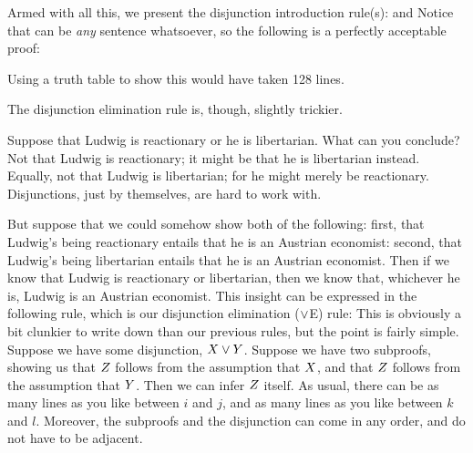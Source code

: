 Armed with all this, we present the disjunction introduction rule(s):
and
Notice that \metaY can be \emph{any} sentence whatsoever, so the following is a perfectly acceptable proof:
\begin{pf}
\end{pf}
Using a truth table to show this would have taken 128 lines.

The disjunction elimination rule is, though, slightly trickier. 

Suppose that  Ludwig is reactionary or he is libertarian. What can you conclude? Not that Ludwig is reactionary; it might be that he is libertarian instead. Equally, not that Ludwig is libertarian; for he might merely be reactionary. Disjunctions, just by themselves, are hard to work with. 

But suppose that we could somehow show both of the following: first, that Ludwig's being reactionary entails that he is an Austrian economist: second, that Ludwig's being libertarian entails that he is an Austrian economist. Then if we know that Ludwig is reactionary or libertarian, then we know that, whichever he is, Ludwig is an Austrian economist. This insight can be expressed in the following rule, which is our disjunction elimination ($\vee$E) rule:
This is obviously a bit clunkier to write down than our previous rules, but the point is fairly simple. Suppose we have some disjunction, $X \vee Y$. Suppose we have two subproofs, showing us that $Z$ follows from the assumption that $X$, and that $Z$ follows from the assumption that $Y$. Then we can infer $Z$ itself. As usual, there can be as many lines as you like between $i$ and $j$, and as many lines as you like between $k$ and $l$. Moreover, the subproofs and the disjunction can come in any order, and do not have to be adjacent.

